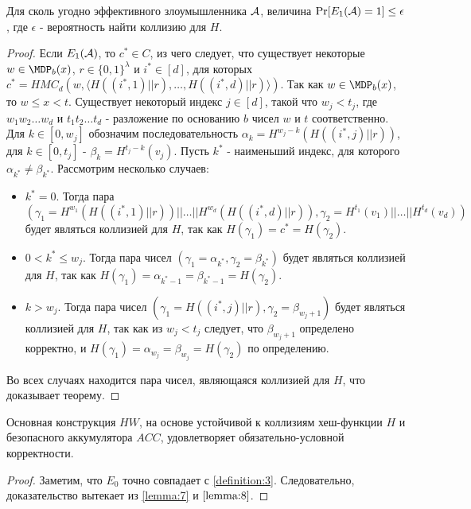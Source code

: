 \begin{theorem}
	\label{lemma:8}
	Для сколь угодно эффективного злоумышленника $\mathcal{A}$, величина $\Pr[E_1(\mathcal{A}) = 1] \leq \epsilon$, где $\epsilon$ - вероятность найти коллизию для $H$.
\end{theorem}

\begin{proof}
	Если $E_1(\mathcal{A})$, то $c^* \in C$, из чего следует, что существует некоторые $w \in \MDP_b(x)$, $r \in \{0, 1\}^\lambda$ и $i^* \in [d]$, для которых $c^* = HMC_d(w, \langle H((i^*, 1) || r), \dots, H((i^*, d) || r) \rangle)$.
	Так как $w \in \MDP_b(x)$, то $w \leq x < t$.
	Существует некоторый индекс $j \in [d]$, такой что $w_j < t_j$, где $w_1 w_2 \dots w_d$ и $t_1 t_2 \dots t_d$ - разложение по основанию $b$ чисел $w$ и $t$ соответственно.
	Для $k \in [0, w_j]$ обозначим последовательность $\alpha_k = H^{w_j - k}(H((i^*, j) || r))$, для $k \in [0, t_j]$ - $\beta_k = H^{t_j - k}(v_j)$.
	Пусть $k^*$ - наименьший индекс, для которого $\alpha_{k^*} \neq \beta_{k^*}$.
	Рассмотрим несколько случаев:
	\begin{itemize}
		\item $k^* = 0$. Тогда пара $(\gamma_1 = H^{w_1}(H((i^*, 1) || r)) || \dots || H^{w_d}(H((i^*, d) || r)), \gamma_2 = H^{t_1}(v_1) || \dots || H^{t_d}(v_d))$ будет являться коллизией для $H$, так как $H(\gamma_1) = c^* = H(\gamma_2)$.
		\item $0 < k^* \leq w_j$. Тогда пара чисел $(\gamma_1 = \alpha_{k^*}, \gamma_2 = \beta_{k^*})$ будет являться коллизией для $H$, так как $H(\gamma_1) = \alpha_{k^* - 1} = \beta_{k^* - 1} = H(\gamma_2)$.
		\item $k > w_j$. Тогда пара чисел $(\gamma_1 = H((i^*, j) || r), \gamma_2 = \beta_{w_j + 1})$ будет являться коллизией для $H$, так как из $w_j < t_j$ следует, что $\beta_{w_j + 1}$ определено корректно, и $H(\gamma_1) = \alpha_{w_j} = \beta_{w_j} = H(\gamma_2)$ по определению.
	\end{itemize}
	Во всех случаях находится пара чисел, являющаяся коллизией для $H$, что доказывает теорему.
\end{proof}

\begin{theorem}
	\label{lemma:6}
	Основная конструкция $HW$, на основе устойчивой к коллизиям хеш-функции $H$ и безопасного аккумулятора $ACC$, удовлетворяет обязательно-условной корректности.
\end{theorem}

\begin{proof}
	Заметим, что $E_0$ точно совпадает с \ref{definition:3}.
	Следовательно, доказательство вытекает из \ref{lemma:7} и $\ref{lemma:8}$.
\end{proof}

